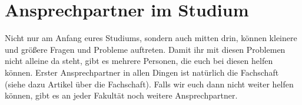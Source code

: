 \section{Ansprechpartner im Studium}

Nicht nur am Anfang eures Studiums, sondern auch mitten drin, können kleinere und
größere Fragen und Probleme auftreten. Damit ihr mit diesen Problemen nicht alleine
da steht, gibt es mehrere Personen, die euch bei diesen helfen können. Erster
Ansprechpartner in allen Dingen ist natürlich die Fachschaft (siehe dazu Artikel
über die Fachschaft). Falls wir euch dann nicht weiter helfen können, gibt es an
jeder Fakultät noch weitere Ansprechpartner.

\newcommand{\proffoto}[2]{
    \centering
    \texttt{[image: \#1]}\\
    #2
    \vspace{4mm}
}


